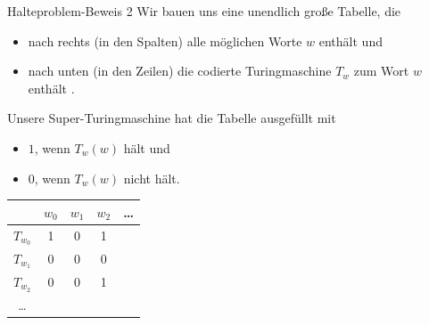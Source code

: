 \begin{frame}{Halteproblem-Beweis 2}
    Wir bauen uns eine unendlich große Tabelle, die
    \begin{itemize}
        \item nach rechts (in den Spalten) alle möglichen Worte $w$ enthält und
        \item nach unten (in den Zeilen) die codierte Turingmaschine $T_w$ zum Wort $w$ enthält .
    \end{itemize}
    \pause
    Unsere Super-Turingmaschine hat die Tabelle ausgefüllt mit
    \begin{itemize}
        \item $1$, wenn $T_w\left( w \right)$ hält und
        \item $0$, wenn $T_w\left( w \right)$ nicht hält.
    \end{itemize}
    \pause
    \begin{table}
        \centering
        \begin{tabular}{ccccl}
            \toprule
                     & $w_0$ & $w_1$ & $w_2$ & \dots\\
             \midrule
             $T_{w_0}$ & 1 & 0 & 1 & \\
             $T_{w_1}$ & 0 & 0 & 0 & \\
             $T_{w_2}$ & 0 & 0 & 1 & \\
             \dots   &  &   &   &  \\
             \bottomrule
        \end{tabular}
    \end{table}
\end{frame}
